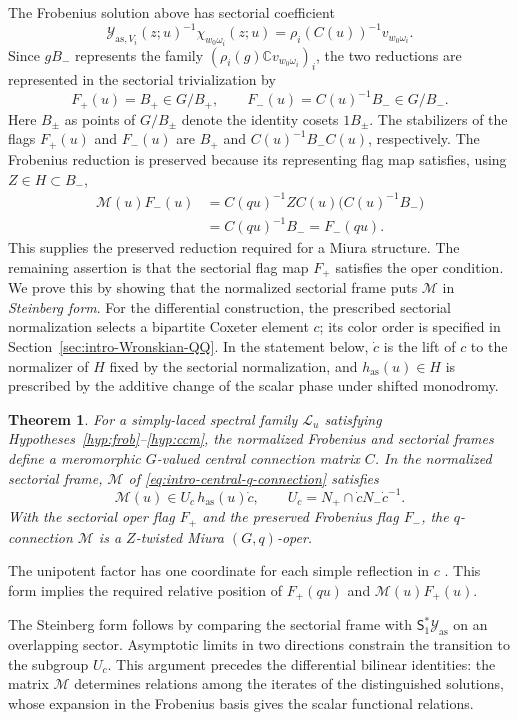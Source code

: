 \documentclass[11pt,leqno]{amsart}
\numberwithin{equation}{section}
\theoremstyle{plain}
\newtheorem{theorem}{Theorem}[section]
\theoremstyle{definition}
\theoremstyle{plain}
\theoremstyle{definition}
\theoremstyle{remark}
\begin{document}
The Frobenius solution above has sectorial coefficient
\[
 \mathcal Y_{\mathrm{as},V_i}(z;u)^{-1}
       \chi_{w_0\omega_i}(z;u)
 =\rho_i(C(u))^{-1}v_{w_0\omega_i}.
\]
Since $gB_-$ represents the family $(\rho_i(g)\mathbb Cv_{w_0\omega_i})_i$, the two reductions are represented in the sectorial trivialization by
\[
 F_+(u)=B_+\in G/B_+,
 \qquad F_-(u)=C(u)^{-1}B_-\in G/B_-.
\]
Here $B_\pm$ as points of $G/B_\pm$ denote the identity cosets $1B_\pm$.  The stabilizers of the flags $F_+(u)$ and $F_-(u)$ are $B_+$ and $C(u)^{-1}B_-C(u)$, respectively.  The Frobenius reduction is preserved because its representing flag map satisfies, using $Z\in H\subset B_-$,
\[
 \begin{aligned}
 \mathscr M(u)F_-(u)
 &=C(qu)^{-1}ZC(u)\bigl(C(u)^{-1}B_-\bigr)\\
 &=C(qu)^{-1}B_-=F_-(qu).
 \end{aligned}
\]
This supplies the preserved reduction required for a Miura structure.  The remaining assertion is that the sectorial flag map $F_+$ satisfies the oper condition.  We prove this by showing that the normalized sectorial frame puts $\mathscr M$ in \emph{Steinberg form}.  For the differential construction, the prescribed sectorial normalization selects a bipartite Coxeter element $c$; its color order is specified in Section~\ref{sec:intro-Wronskian-QQ}.  In the statement below, $\dot c$ is the lift of $c$ to the normalizer of $H$ fixed by the sectorial normalization, and $h_{\mathrm{as}}(u)\in H$ is prescribed by the additive change of the scalar phase under shifted monodromy.
\begin{theorem}\label{thm:intro-main}
For a simply-laced spectral family $\mathcal L_u$ satisfying Hypotheses~\ref{hyp:frob}--\ref{hyp:ccm}, the normalized Frobenius and sectorial frames define a meromorphic $G$-valued central connection matrix $C$.  In the normalized sectorial frame, $\mathscr M$ of \eqref{eq:intro-central-q-connection} satisfies
\[
 \mathscr M(u)\in U_c\,h_{\mathrm{as}}(u)\dot c,
 \qquad U_c=N_+\cap\dot cN_-\dot c^{-1}.
\]
With the sectorial oper flag $F_+$ and the preserved Frobenius flag $F_-$, the $q$-connection $\mathscr M$ is a $Z$-twisted Miura $(G,q)$-oper.
\end{theorem}
The unipotent factor has one coordinate for each simple reflection in $c$ \cite{Steinberg1965}.  This form implies the required relative position of $F_+(qu)$ and $\mathscr M(u)F_+(u)$.

The Steinberg form follows by comparing the sectorial frame with $\mathsf S_1^*\mathcal Y_{\mathrm{as}}$ on an overlapping sector.  Asymptotic limits in two directions constrain the transition to the subgroup $U_c$.  This argument precedes the differential bilinear identities: the matrix $\mathscr M$ determines relations among the iterates of the distinguished solutions, whose expansion in the Frobenius basis gives the scalar functional relations.
\end{document}
